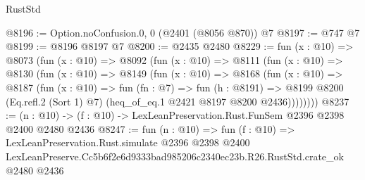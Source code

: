 \begin{lexlean}{RustStd}
\begin{coremodule}
@8196 := Option.noConfusion.{0, 0} (@2401 (@8056 @870)) @7
@8197 := @747 @7
@8199 := @8196 @8197 @7
@8200 := @2435 @2480
@8229 := fun (x : @10) =>
  @8073
    (fun (x : @10) =>
    @8092
      (fun (x : @10) =>
      @8111
        (fun (x : @10) =>
        @8130
          (fun (x : @10) =>
          @8149
            (fun (x : @10) =>
            @8168
              (fun (x : @10) =>
              @8187
                (fun (x : @10) =>
                fun (fn : @7) =>
                fun (h : @8191) =>
                @8199 @8200 (Eq.refl.{2} (Sort 1) @7) (heq_of_eq.{1} @2421 @8197 @8200 @2436))))))))
@8237 := (n : @10) -> (f : @10) -> LexLeanPreservation.Rust.FunSem @2396 @2398 @2400 @2480 @2436
@8247 := fun (n : @10) =>
  fun (f : @10) =>
  LexLeanPreservation.Rust.simulate
    @2396
    @2398
    @2400
    LexLeanPreserve.Cc5b6f2e6d9333bad985206c2340ec23b.R26.RustStd.crate_ok
    @2480
    @2436
\end{coremodule}
\end{lexlean}
